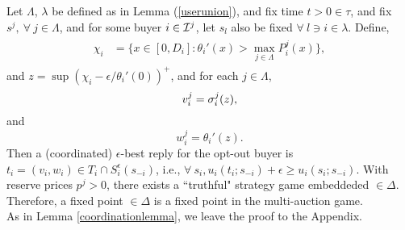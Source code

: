 {
\label{incentive}
Let $\Lambda$, $\lambda$ be defined as in Lemma (\ref{userunion}), and fix time
$t>0 \in \tau$, and fix $s^j, \ \forall \ j\in\Lambda$, and for some
buyer $i\in \mathcal{I}^j$, let $s_l$ also be fixed $\forall \ l\ni i \in \lambda$. Define,
\begin{align}
\begin{split}\label{eta}
    \chi_i &= \bigg\lbrace x\in [0,D_i] : 
 {\theta_i}'(x) > \max_{j\in\Lambda}P_i^j(x)\bigg\rbrace, 
\end{split}
\end{align}
and $z = \sup(\chi_i - \epsilon / \theta_i'(0))^+$, and for each $j \in
\Lambda$, 
$$
    v_i^j = \sigma_i^{j}(z),
$$
and 
$$
    w_i^j = \theta_i'(z).%
$$
Then a (coordinated) $\epsilon$-best reply for the opt-out buyer is $t_i =
(v_i,w_i) \in T_i\cap S_i^\epsilon(s_{-i})$, i.e., $\forall \ s_i, u_i(t_i;s_{-i}) + \epsilon \ge u_i(s_i;
s_{-i})$.
With reserve prices $p^j >0$, there exists a ``truthful" strategy game embeddeded
$\in\Delta$. Therefore, a fixed point $\in \Delta$ is a fixed point in
the multi-auction game. 
}\\
As in Lemma \ref{coordinationlemma}, we leave the proof to the Appendix.

